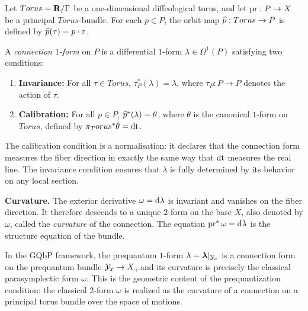   \begin{article}
    \label{art:Connections on Torus Principal Bundles}
    
    Let $Torus = {\mathbf{R}}/\Gamma$ be a one-dimensional diffeological torus,
    and let $\pr: P \to X$ be a principal $Torus$-bundle.
    For each $p \in P$,
    the orbit map $\widehat{p}: Torus \to P$ is defined by
    $\widehat{p}(\tau) = p \cdot \tau$.
    
    \begin{definition}
      A \emph{connection $1$-form} on $P$ is a differential $1$-form
      $\lambda \in \Omega^1(P)$ satisfying two conditions:
      \begin{enumerate}
        \item \textbf{Invariance:}
        For all $\tau \in Torus$,
        $\tau_P^*(\lambda) = \lambda$,
        where $\tau_P: P \to P$ denotes the action of $\tau$.
        \item \textbf{Calibration:}
        For all $p \in P$,
        $\widehat{p}^*(\lambda) = \theta$,
        where $\theta$ is the canonical $1$-form on $Torus$,
        defined by $\pi_Torus^*\theta = \mathrm{dt}$.
      \end{enumerate}
    \end{definition}
    
    The calibration condition is a normalisation:
    it declares that the connection form measures the fiber direction
    in exactly the same way that $\mathrm{dt}$ measures the real line.
    The invariance condition ensures that $\lambda$ is fully determined
    by its behavior on any local section.
    
    \medskip
    \noindent
    \textbf{Curvature.}
    The exterior derivative $\omega = \mathrm{d}\lambda$ is invariant
    and vanishes on the fiber direction.
    It therefore descends to a unique $2$-form on the base $X$,
    also denoted by $\omega$,
    called the \emph{curvature} of the connection.
    The equation $\pr^*\omega = \der\lambda$ is the structure equation
    of the bundle.
    
    In the GQbP framework,
    the prequantum $1$-form $\lambda = \boldsymbol \lambda|_{\mathcal{Y}_x}$ is a connection form
    on the prequantum bundle $\mathcal{Y}_x \to X$,
    and its curvature is precisely the classical parasymplectic form $\omega$.
    This is the geometric content of the prequantization condition:
    the classical $2$-form $\omega$ is realized as the curvature of a connection
    on a principal torus bundle over the space of motions.
  \end{article}
  
